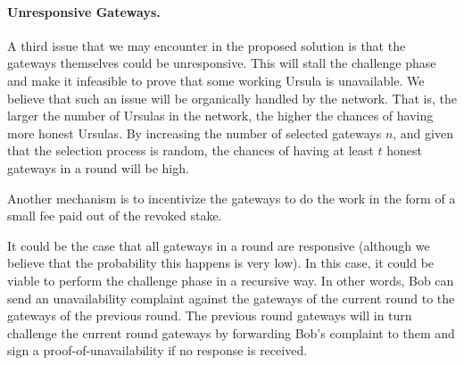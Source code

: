 \paragraph{\bf Unresponsive Gateways.}
A third issue that we may encounter in the proposed solution is that the gateways themselves could be unresponsive. This will stall the challenge phase and make it infeasible to prove that some working Ursula is unavailable. We believe that such an issue will be organically handled by the network. That is, the larger the number of Ursulas in the network, the higher the chances of having more honest Ursulas. By increasing the number of selected gateways $n$, and given that the selection process is random, the chances of having at least $t$ honest gateways in a round will be high.


Another mechanism is to incentivize the gateways to do the work in the form of a small fee paid out of the revoked stake.


It could be the case that all gateways in a round are responsive (although we believe that the probability this happens is very low). In this case, it could be viable to perform the challenge phase in a recursive way. In other words, Bob can send an unavailability complaint against the gateways of the current round to the gateways of the previous round. The previous round gateways will in turn challenge the current round gateways by forwarding Bob's complaint to them and sign a proof-of-unavailability if no response is received. 

